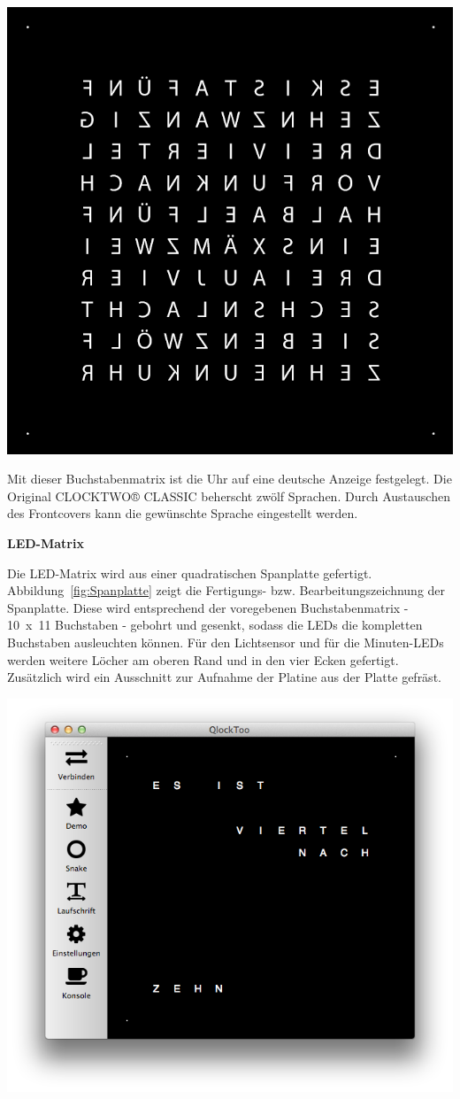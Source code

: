 \begin{multicols}{2}
{
\centering\includegraphics[width=0.85\columnwidth]{Abbildungen/Konstruktion/Buchstaben}

}
Mit dieser Buchstabenmatrix ist die Uhr auf eine deutsche Anzeige festgelegt. Die Original CLOCKTWO® CLASSIC beherscht zwölf Sprachen. Durch Austauschen des Frontcovers kann die gewünschte Sprache eingestellt werden. 

\textbf{LED-Matrix}

Die LED-Matrix wird aus einer quadratischen Spanplatte gefertigt. Abbildung~\ref{fig:Spanplatte} zeigt die Fertigungs- bzw. Bearbeitungszeichnung der Spanplatte. Diese wird entsprechend der voregebenen Buchstabenmatrix -  10~x~11 Buchstaben - gebohrt und gesenkt, sodass die LEDs die kompletten Buchstaben ausleuchten können. Für den Lichtsensor und für die Minuten-LEDs werden weitere Löcher am oberen Rand und in den vier Ecken gefertigt. Zusätzlich wird ein Ausschnitt zur Aufnahme der Platine aus der Platte gefräst. 

\includegraphics[width=\columnwidth]{Abbildungen/Software/Manager} %


\end{multicols}
